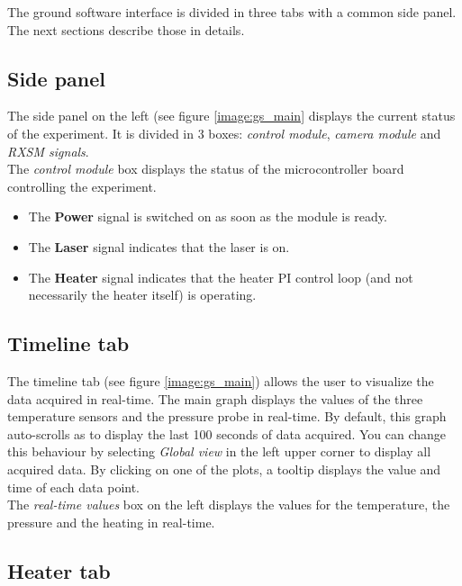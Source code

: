 \documentclass[11pt,a4paper,oneside]{report}
\begin{document}
The ground software interface is divided in three tabs with a common side panel.
The next sections describe those in details.

\subsection{Side panel}

The side panel on the left (see figure \ref{image:gs_main} displays the current status of the experiment.
It is divided in 3 boxes: \emph{control module}, \emph{camera module} and \emph{RXSM signals}. \\

The \emph{control module} box displays the status of the microcontroller board controlling the experiment.
\begin{itemize}
\item The \textbf{Power} signal is switched on as soon as the module is ready.
\item The \textbf{Laser} signal indicates that the laser is on.
\item The \textbf{Heater} signal indicates that the heater PI control loop (and not necessarily the heater itself) is operating.
\end{itemize}

\subsection{Timeline tab}

The timeline tab (see figure \ref{image:gs_main}) allows the user to visualize the data acquired in real-time.
The main graph displays the values of the three temperature sensors and the pressure probe in real-time.
By default, this graph auto-scrolls as to display the last 100 seconds of data acquired.
You can change this behaviour by selecting \emph{Global view} in the left upper corner to display all acquired data.
By clicking on one of the plots, a tooltip displays the value and time of each data point. \\

The \emph{real-time values} box on the left displays the values for the temperature, the pressure and the heating in real-time.

\subsection{Heater tab}
\end{document}
